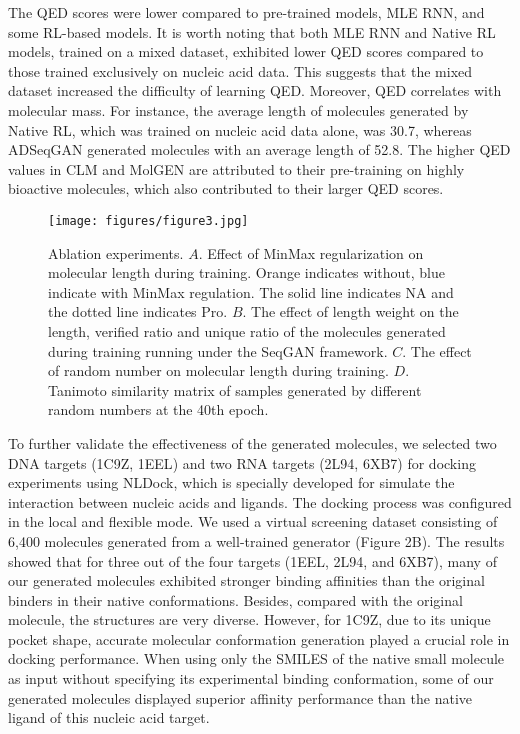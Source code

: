 \documentclass[10pt, twocolumn]{article}
\begin{document}
The QED scores were lower compared to pre-trained models, MLE RNN, and some RL-based models. It is worth noting that both MLE RNN and Native RL models, trained on a mixed dataset, exhibited lower QED scores compared to those trained exclusively on nucleic acid data. This suggests that the mixed dataset increased the difficulty of learning QED. Moreover, QED correlates with molecular mass. For instance, the average length of molecules generated by Native RL, which was trained on nucleic acid data alone, was 30.7, whereas ADSeqGAN generated molecules with an average length of 52.8. The higher QED values in CLM and MolGEN are attributed to their pre-training on highly bioactive molecules, which also contributed to their larger QED scores.

\begin{figure*}[!htb]
    \centering
    \texttt{[image: figures/figure3.jpg]}
    \caption{\small Ablation experiments. $A.$ Effect of MinMax regularization on molecular length during training. Orange indicates without, blue indicate with MinMax regulation. The solid line indicates NA and the dotted line indicates Pro. $B.$ The effect of length weight on the length, verified ratio and unique ratio of the molecules generated during training running under the SeqGAN framework. $C.$ The effect of random number on molecular length during training. $D.$ Tanimoto similarity matrix of samples generated by different random numbers at the 40th epoch. }
    \label{fig:fig3}
\end{figure*}

To further validate the effectiveness of the generated molecules, we selected two DNA targets (1C9Z\cite{Shui2000}, 1EEL\cite{Mazur2000}) and two RNA targets (2L94\cite{Marcheschi2011}, 6XB7\cite{Davila-Calderon2020}) for docking experiments using NLDock\cite{Feng2021}, which is specially developed for simulate the interaction between nucleic acids and ligands. The docking process was configured in the local and flexible mode. We used a virtual screening dataset consisting of 6,400 molecules generated from a well-trained generator (Figure 2B). The results showed that for three out of the four targets (1EEL, 2L94, and 6XB7), many of our generated molecules exhibited stronger binding affinities than the original binders in their native conformations. Besides, compared with the original molecule, the structures are very diverse. However, for 1C9Z, due to its unique pocket shape, accurate molecular conformation generation played a crucial role in docking performance. When using only the SMILES of the native small molecule as input without specifying its experimental binding conformation, some of our generated molecules displayed superior affinity performance than the native ligand of this nucleic acid target.  
\end{document}
